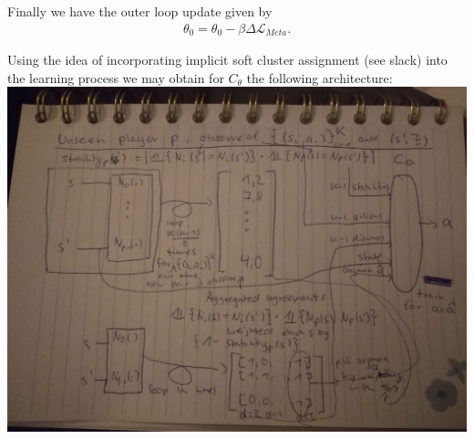 \documentclass[a4paper, 11pt]{article}
\begin{document}
	Finally we have the outer loop update given by
	\begin{align*}
	\theta_0 = \theta_0 - \beta \Delta \mathcal{L}_{Meta}.
	\end{align*}
	
	Using the idea of incorporating implicit soft cluster assignment (see slack) into the learning process we may obtain for $C_\theta$ the following architecture:\\
	
	\includegraphics[scale=.5]{architecture}
	
	
	
	
	
\end{document}
